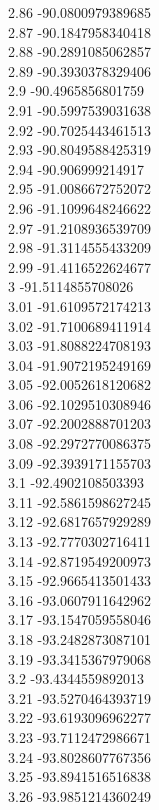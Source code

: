 {2.86	-90.0800979389685\\
2.87	-90.1847958340418\\
2.88	-90.2891085062857\\
2.89	-90.3930378329406\\
2.9	-90.4965856801759\\
2.91	-90.5997539031638\\
2.92	-90.7025443461513\\
2.93	-90.8049588425319\\
2.94	-90.906999214917\\
2.95	-91.0086672752072\\
2.96	-91.1099648246622\\
2.97	-91.2108936539709\\
2.98	-91.3114555433209\\
2.99	-91.4116522624677\\
3	-91.5114855708026\\
3.01	-91.6109572174213\\
3.02	-91.7100689411914\\
3.03	-91.8088224708193\\
3.04	-91.9072195249169\\
3.05	-92.0052618120682\\
3.06	-92.1029510308946\\
3.07	-92.2002888701203\\
3.08	-92.2972770086375\\
3.09	-92.3939171155703\\
3.1	-92.4902108503393\\
3.11	-92.5861598627245\\
3.12	-92.6817657929289\\
3.13	-92.7770302716411\\
3.14	-92.8719549200973\\
3.15	-92.9665413501433\\
3.16	-93.0607911642962\\
3.17	-93.1547059558046\\
3.18	-93.2482873087101\\
3.19	-93.3415367979068\\
3.2	-93.4344559892013\\
3.21	-93.5270464393719\\
3.22	-93.6193096962277\\
3.23	-93.7112472986671\\
3.24	-93.8028607767356\\
3.25	-93.8941516516838\\
3.26	-93.9851214360249\\
}
